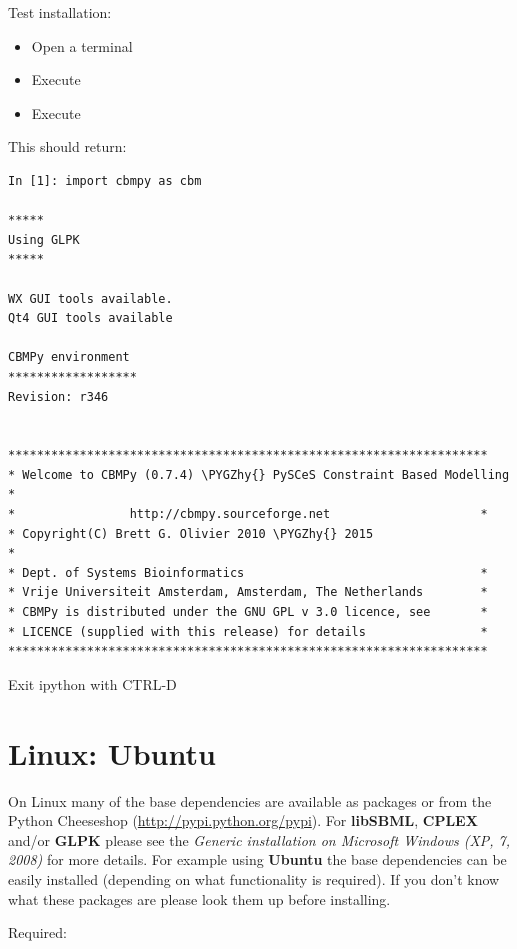 \documentclass[a4paper,11pt,english]{sphinxmanual}
\def\PYGZhy{\char`\-}
\begin{document}
Test installation:
\begin{itemize}
\item {} 
Open a terminal

\item {} 
Execute 

\item {} 
Execute 

\end{itemize}

This should return:

\begin{Verbatim}[commandchars=\\\{\}]
In [1]: import cbmpy as cbm

*****
Using GLPK
*****

WX GUI tools available.
Qt4 GUI tools available

CBMPy environment
******************
Revision: r346


*******************************************************************
* Welcome to CBMPy (0.7.4) \PYGZhy{} PySCeS Constraint Based Modelling    *
*                http://cbmpy.sourceforge.net                     *
* Copyright(C) Brett G. Olivier 2010 \PYGZhy{} 2015                       *
* Dept. of Systems Bioinformatics                                 *
* Vrije Universiteit Amsterdam, Amsterdam, The Netherlands        *
* CBMPy is distributed under the GNU GPL v 3.0 licence, see       *
* LICENCE (supplied with this release) for details                *
*******************************************************************
\end{Verbatim}

Exit ipython with CTRL-D


\section{Linux: Ubuntu}
\label{install_doc:linux-ubuntu}
On Linux many of the base dependencies are available as packages or from the Python Cheeseshop (\href{http://pypi.python.org/pypi}{http://pypi.python.org/pypi}).
For \textbf{libSBML}, \textbf{CPLEX} and/or \textbf{GLPK} please see the \emph{Generic installation on Microsoft Windows (XP, 7, 2008)} for more details.
For example using \textbf{Ubuntu} the base dependencies can be easily installed (depending on what functionality is required).
If you don't know what these packages are please look them up before installing.

Required:
\end{document}
